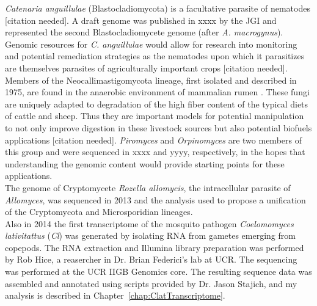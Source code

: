 \indent \textit{Catenaria anguillulae} (Blastocladiomycota) is a facultative parasite of nematodes [citation needed]. A draft genome was published in xxxx by the JGI and represented the second Blastocladiomycete genome (after \textit{A. macrogynus}). Genomic resources for \textit{C. anguillulae} would allow for research into monitoring and potential remediation strategies as the nematodes upon which it parasitizes are themselves parasites of agriculturally important crops [citation needed].\\
\indent Members of the Neocallimastigomycota lineage, first isolated and described in 1975, are found in the anaerobic environment of mammalian rumen \cite{Orpin1975}. These fungi are uniquely adapted to degradation of the high fiber content of the typical diets of cattle and sheep. Thus they are important models for potential manipulation to not only improve digestion in these livestock sources \cite{Ho1995} but also potential biofuels applications [citation needed]. \textit{Piromyces} and \textit{Orpinomyces} are two members of this group and were sequenced in xxxx and yyyy, respectively, in the hopes that understanding the genomic content would provide starting points for these applications. \\
\indent The genome of Cryptomycete \textit{Rozella allomycis}, the intracellular parasite of \textit{Allomyces}, was sequenced in 2013 \cite{James2013} and the analysis used to propose a unification of the Cryptomycota and Microsporidian lineages.\\
\indent Also in 2014 the first transcriptome of the mosquito pathogen \textit{Coelomomyces lativitattus} (\textit{Cl}) was generated by isolating RNA from gametes emerging from copepods. The RNA extraction and Illumina library preparation was performed by Rob Hice, a reasercher in Dr. Brian Federici's lab at UCR. The sequencing was performed at the UCR IIGB Genomics core. The resulting sequence data was assembled and annotated using scripts provided by Dr. Jason Stajich, and my analysis is described in Chapter~\ref{chap:ClatTranscriptome}.\\

